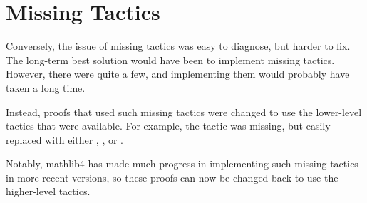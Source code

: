 \section{Missing Tactics} 
Conversely, the issue of missing tactics was easy to diagnose, but harder to fix.
The long-term best solution would have been to implement missing tactics.
However, there were quite a few, and implementing them would probably have taken a long time.

Instead, proofs that used such missing tactics were changed to use the lower-level tactics that were
available. For example, the  tactic
was missing, but easily replaced with either , , or .

Notably, mathlib4 has made much progress in implementing such missing tactics in more recent versions, 
so these proofs can now be changed back to use the higher-level tactics.



